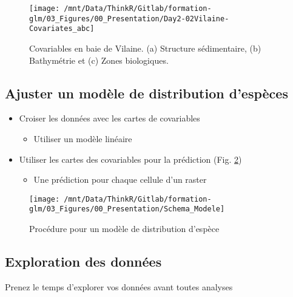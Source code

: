 \documentclass[french,a4paper]{article}
\providecommand{\tightlist}{%
  \setlength{\itemsep}{0pt}\setlength{\parskip}{0pt}}
\begin{document}
\begin{figure}[!h]

{\centering \texttt{[image: /mnt/Data/ThinkR/Gitlab/formation-glm/03\_Figures/00\_Presentation/Day2-02Vilaine-Covariates\_abc]} 

}

\caption{Covariables en baie de Vilaine. (a) Structure
sédimentaire, (b) Bathymétrie et (c) Zones biologiques.}\label{fig:figCovariates}
\end{figure}

\subsection{Ajuster un modèle de distribution
d'espèces}\label{ajuster-un-modele-de-distribution-despeces}

\begin{itemize}
\tightlist
\item
  Croiser les données avec les cartes de covariables

  \begin{itemize}
  \tightlist
  \item
    Utiliser un modèle linéaire
  \end{itemize}
\item
  Utiliser les cartes des covariables pour la prédiction (Fig.
  \ref{fig:figProcedure})

  \begin{itemize}
  \tightlist
  \item
    Une prédiction pour chaque cellule d'un raster
  \end{itemize}
\end{itemize}



\begin{figure}[!h]

{\centering \texttt{[image: /mnt/Data/ThinkR/Gitlab/formation-glm/03\_Figures/00\_Presentation/Schema\_Modele]} 

}

\caption{Procédure pour un modèle de distribution d'espèce}\label{fig:figProcedure}
\end{figure}

\subsection{Exploration des données}\label{exploration-des-donnees}

\nopandoc{\begin{redbox}} Prenez le temps d'explorer vos données avant
toutes analyses \nopandoc{\end{redbox}}
\end{document}

